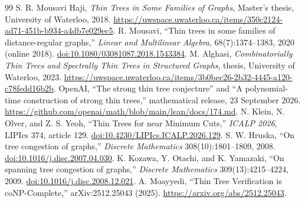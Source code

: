 \documentclass[11pt,a4paper]{article}
\begin{document}
\begin{thebibliography}{99}
 S. R. Mousavi Haji, \emph{Thin Trees in Some Families of Graphs}, Master's thesis, University of Waterloo, 2018. \url{https://uwspace.uwaterloo.ca/items/350c2124-ad71-451b-b934-a4db7e029ec5}.
 R. Mousavi, ``Thin trees in some families of distance-regular graphs,'' \emph{Linear and Multilinear Algebra}, 68(7):1374--1383, 2020 (online 2018). \href{https://doi.org/10.1080/03081087.2018.1543384}{doi:10.1080/03081087.2018.1543384}.
 M. Alghasi, \emph{Combinatorially Thin Trees and Spectrally Thin Trees in Structured Graphs}, thesis, University of Waterloo, 2023. \url{https://uwspace.uwaterloo.ca/items/3b0bec26-2b32-4445-a120-c78fedd16b2b}.
 OpenAI, ``The strong thin tree conjecture'' and ``A polynomial-time construction of strong thin trees,'' mathematical release, 23 September 2026. \url{https://github.com/openai/math/blob/main/lean/docs/174.md}.
 N. Klein, N. Olver, and Z. S. Yeoh, ``Thin Trees for near Minimum Cuts,'' \emph{ICALP 2026}, LIPIcs 374, article 129. \href{https://doi.org/10.4230/LIPIcs.ICALP.2026.129}{doi:10.4230/LIPIcs.ICALP.2026.129}.
 S. W. Hruska, ``On tree congestion of graphs,'' \emph{Discrete Mathematics} 308(10):1801--1809, 2008. \href{https://doi.org/10.1016/j.disc.2007.04.030}{doi:10.1016/j.disc.2007.04.030}.
 K. Kozawa, Y. Otachi, and K. Yamazaki, ``On spanning tree congestion of graphs,'' \emph{Discrete Mathematics} 309(13):4215--4224, 2009. \href{https://doi.org/10.1016/j.disc.2008.12.021}{doi:10.1016/j.disc.2008.12.021}.
 A. Moayyedi, ``Thin Tree Verification is coNP-Complete,'' arXiv:2512.25043 (2025). \url{https://arxiv.org/abs/2512.25043}.
\end{thebibliography}
\end{document}
